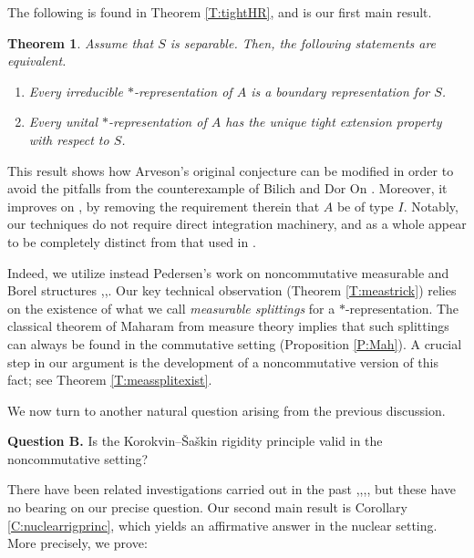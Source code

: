 \documentclass[10pt]{amsart}
\newtheorem{theoremx}{Theorem}
\theoremstyle{definition}
\begin{document}
The following is found in Theorem \ref{T:tightHR}, and  is our first main result.




\begin{theoremx}\label{T:A}
Assume that $S$ is separable. Then, the following statements are equivalent.
\begin{enumerate}[{\rm (i)}]
\item Every irreducible $*$-representation of $A$ is a boundary representation for $S$. 
\item Every unital $*$-representation of $A$ has the unique tight extension property with respect to $S$.
\end{enumerate}
\end{theoremx}

This result shows how Arveson's original conjecture can be modified in order to avoid the pitfalls from the counterexample of Bilich and Dor On \cite{bilich2024arveson}.  Moreover, it improves on \cite[Corollary 3.3]{kleski2014korovkin}, by removing the requirement therein that $A$ be of type $I$. Notably, our techniques do not require direct integration machinery, and as a whole appear to be completely distinct from that used in \cite{kleski2014korovkin}. 

Indeed, we utilize instead Pedersen's work on noncommutative measurable and Borel structures \cite{pedersen1974},\cite{pedersen1976},\cite[Sections 4.5 and 4.6]{eilers2018c}. Our key technical observation (Theorem \ref{T:meastrick}) relies on the existence of what we call \emph{measurable splittings} for a $*$-representation. The classical theorem of Maharam from measure theory implies that such splittings can always be found in the commutative setting (Proposition \ref{P:Mah}). A crucial step in our argument is the development of a noncommutative version of this fact; see Theorem \ref{T:meassplitexist}.

 
We now turn to another natural question arising from the previous discussion.

\vspace{3mm}


\noindent  \textbf{Question B.} 
Is the Korokvin--\v{S}a\v{s}kin rigidity principle valid in the noncommutative setting?

\vspace{3mm}

There have been related investigations carried out in the past
\cite{choda1963theorems},\cite{priestley1976noncommutative},\cite{robertson1977korovkin},\cite{uchiyama1999korovkin}, but these have no bearing on our precise question. Our second main result is Corollary \ref{C:nuclearrigprinc}, which yields an affirmative answer in the nuclear setting. More precisely, we prove:
\end{document}

